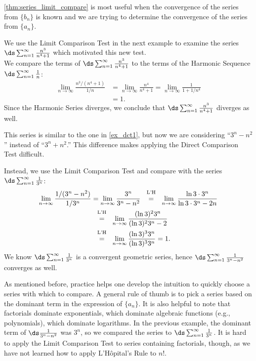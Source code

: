 \autoref{thm:series_limit_compare} is most useful when the convergence of the series from $\{b_n\}$ is known and we are trying to determine the convergence of the series from $\{a_n\}$. 

We use the Limit Comparison Test in the next example to examine the series $\ds\sum_{n=1}^\infty \frac{n^3}{n^4+1}$ which motivated this new test.\\

{We compare the terms of $\ds\sum_{n=1}^\infty \frac{n^3}{n^4+1}$ to the terms of the Harmonic Sequence $\ds\sum_{n=1}^\infty \frac1{n}$:
\begin{align*}
	\lim_{n\to\infty}\frac{{n^3}/(n^4+1)}{1/n}
	&= \lim_{n\to\infty} \frac{n^4}{n^4+1}= \lim_{n\to\infty} \frac{1}{1+1/n^4} \\
	&= 1.
\end{align*}
Since the Harmonic Series diverges, we conclude that $\ds\sum_{n=1}^\infty \frac{n^3}{n^4+1}$ diverges as well.}


{This series is similar to the one in \autoref{ex_dct1}, but now we are considering ``$3^n-n^2$'' instead of ``$3^n+n^2$.'' This difference makes applying the Direct Comparison Test difficult.

Instead, we use the Limit Comparison Test and compare with the series $\ds\sum_{n=1}^\infty \frac1{3^n}$:
\begin{align*}
	\lim_{n\to\infty}\frac{1/(3^n-n^2)}{1/3^n}
	&= \lim_{n\to\infty}\frac{3^n}{3^n-n^2} \stackrel{\ \text{ L'H \rule[-5pt]{0pt}{3pt}} \ }{=} \lim_{n\to\infty} \frac{\ln 3 \cdot 3^n}{\ln 3 \cdot 3^n -2n}\\
& \stackrel{\ \text{ L'H \rule[-5pt]{0pt}{3pt}} \ }{=} \lim_{n\to\infty} \frac {(\ln 3)^2 3^n}{(\ln 3)^2 3^n -2}\\
	& \stackrel{\ \text{ L'H \rule[-5pt]{0pt}{3pt}} \ }{=} \lim_{n\to\infty} \frac {(\ln 3)^3 3^n}{(\ln 3)^3 3^n}=1.
\end{align*}
We know $\ds\sum_{n=1}^\infty \frac1{3^n}$ is a convergent geometric series, hence $\ds\sum_{n=1}^\infty \frac1{3^n-n^2}$ converges as well.}

As mentioned before, practice helps one develop the intuition to quickly choose a series with which to compare. A general rule of thumb is to pick a series based on the dominant term in the expression of $\{a_n\}$. It is also helpful to note that factorials dominate exponentials, which dominate algebraic functions (e.g., polynomials), which dominate logarithms. In the previous example, the dominant term of $\ds\frac{1}{3^n-n^2}$ was $3^n$, so we compared the series to $\ds \sum_{n=1}^\infty \frac1{3^n}$. It is hard to apply the Limit Comparison Test to series containing factorials, though, as we have not learned how to apply L'H\^opital's Rule to $n!$.\\

